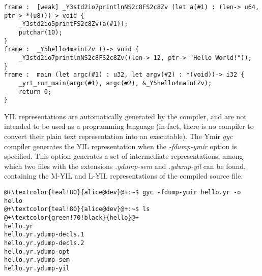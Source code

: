 \begin{lstlisting}[style=lyilVerb, caption=L-YIL reprensentation of \textit{hello.yr}]
frame :  [weak] _Y3std2io7printlnNS2c8FS2c8Zv (let a(#1) : (len-> u64, ptr-> *(u8)))-> void {
    _Y3std2io5printFS2c8Zv(a(#1));
    putchar(10);
}
frame :  _Y5hello4mainFZv ()-> void {
    _Y3std2io7printlnNS2c8FS2c8Zv((len-> 12, ptr-> "Hello World!"));
}
frame :  main (let argc(#1) : u32, let argv(#2) : *(void))-> i32 {
    _yrt_run_main(argc(#1), argc(#2), &_Y5hello4mainFZv);
    return 0;
}
\end{lstlisting}

YIL representations are automatically generated by the compiler, and are not
intended to be used as a programming language (in fact, there is no compiler to
convert their plain text representation into an executable). The
Ymir \textit{gyc} compiler generates the YIL representation when
the \textit{-fdump-ymir} option is specified. This option generates a set of
intermediate representations, among which two files with the
extensions \textit{.ydump-sem} and \textit{.ydump-yil} can be found, containing
the M-YIL and L-YIL representations of the compiled source file.

\begin{lstlisting}[style=bashVerb, escapechar=@+]
@+\textcolor{teal!80}{alice@dev}@+:~$ gyc -fdump-ymir hello.yr -o hello
@+\textcolor{teal!80}{alice@dev}@+:~$ ls
@+\textcolor{green!70!black}{hello}@+
hello.yr
hello.yr.ydump-decls.1
hello.yr.ydump-decls.2
hello.yr.ydump-opt
hello.yr.ydump-sem
hello.yr.ydump-yil
\end{lstlisting}

\vfill
\pagebreak
